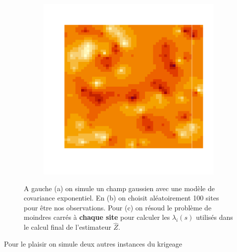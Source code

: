 \documentclass[10pt]{article} %
\begin{document}
\begin{figure}[h!]
\begin{subfigure}[b]{0.3\textwidth}
        \caption{}
        \label{fig:three sin x}
    \end{subfigure}
    \hfill
    \begin{subfigure}[b]{0.3\textwidth}
        \centering
        \includegraphics[width=\textwidth]{media/gauss_interp.png}
        \caption{}
        \label{fig:five over x}
    \end{subfigure}
       \caption{A gauche (a) on simule un champ gaussien avec une modèle de covariance exponentiel. En (b) on choisit aléatoirement 100 sites pour être nos
       observations. Pour (c) on résoud le problème de moindres carrés à \textbf{chaque site} pour calculer les $\lambda_i(s)$ utilisés dans le calcul final
       de l'estimateur $\hat Z$.}
       \label{fig:three graphs}
\end{figure}

Pour le plaisir on simule deux autres instances du krigeage
\end{document}
